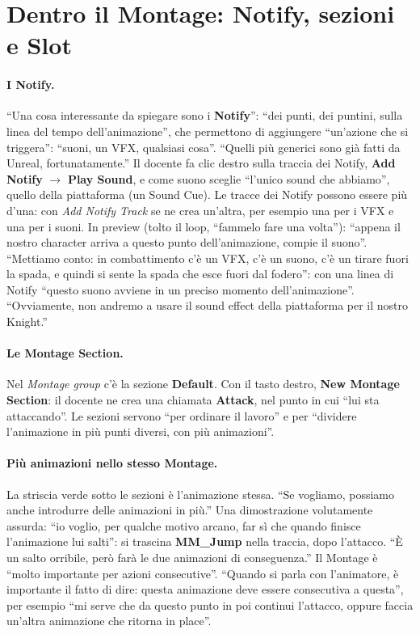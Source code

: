 \section{Dentro il Montage: Notify, sezioni e Slot}
\label{ue9:sec:notify}

\paragraph{I Notify.} ``Una cosa interessante da spiegare sono i \textbf{Notify}'': ``dei
punti, dei puntini, sulla linea del tempo dell'animazione'', che permettono di aggiungere
``un'azione che si triggera'': ``suoni, un VFX, qualsiasi cosa''. ``Quelli più generici
sono già fatti da Unreal, fortunatamente.'' Il docente fa clic destro sulla traccia dei
Notify, \textbf{Add Notify} $\rightarrow$ \textbf{Play Sound}, e come suono sceglie
``l'unico sound che abbiamo'', quello della piattaforma (un Sound Cue). Le tracce dei Notify
possono essere più d'una: con \emph{Add Notify Track} se ne crea un'altra, per esempio
una per i VFX e una per i suoni. In preview (tolto il loop, ``fammelo fare una volta''):
``appena il nostro character arriva a questo punto dell'animazione, compie il suono''.
``Mettiamo conto: in combattimento c'è un VFX, c'è un suono, c'è un tirare fuori la spada,
e quindi si sente la spada che esce fuori dal fodero'': con una linea di Notify ``questo
suono avviene in un preciso momento dell'animazione''. ``Ovviamente, non andremo a usare
il sound effect della piattaforma per il nostro Knight.''

\paragraph{Le Montage Section.} Nel \emph{Montage group} c'è la sezione \textbf{Default}.
Con il tasto destro, \textbf{New Montage Section}: il docente ne crea una chiamata
\textbf{Attack}, nel punto in cui ``lui sta attaccando''. Le sezioni servono ``per
ordinare il lavoro'' e per ``dividere l'animazione in più punti diversi, con più
animazioni''.

\paragraph{Più animazioni nello stesso Montage.} La striscia verde sotto le sezioni è
l'animazione stessa. ``Se vogliamo, possiamo anche introdurre delle animazioni in più.''
Una dimostrazione volutamente assurda: ``io voglio, per qualche motivo arcano, far sì
che quando finisce l'animazione lui salti'': si trascina \textbf{MM\_Jump} nella traccia,
dopo l'attacco. ``È un salto orribile, però farà le due animazioni di conseguenza.'' Il
Montage è ``molto importante per azioni consecutive''. ``Quando si parla con l'animatore,
è importante il fatto di dire: questa animazione deve essere consecutiva a questa'', per
esempio ``mi serve che da questo punto in poi continui l'attacco, oppure faccia un'altra
animazione che ritorna in place''.

